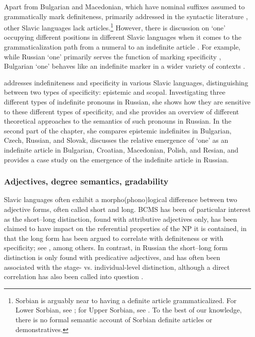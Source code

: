 \documentclass[output=paper,colorlinks,citecolor=brown]{langscibook}
\begin{document}
Apart from Bulgarian and Macedonian, which have nominal suffixes assumed to grammatically mark definiteness, primarily addressed in the syntactic literature \citep[for recent discussion, see][]{Rudin2021}, other Slavic languages lack articles.\footnote{Sorbian is arguably near to having a definite article grammaticalized. For Lower Sorbian, see \citet{Pankau2021}; for Upper Sorbian, see \citet{Scholze2012}. To the best of our knowledge, there is no formal semantic account of Sorbian definite articles or demonstratives.} However, there is discussion on `one' occupying different positions in different Slavic languages when it comes to the grammaticalization path from a numeral to an indefinite article \citep[see, e.g.,][]{Hwaszcz.Kedzierska2018,Seres2024,Molinari2025}. For example, while Russian `one' primarily serves the function of marking specificity \citep[see also][]{Ionin2013}, Bulgarian `one' behaves like an indefinite marker in a wider variety of contexts \citep[see, e.g.,][]{geist13,Gorishneva2013,gorishneva16}.

 addresses indefiniteness and specificity in various Slavic languages, distinguishing between two types of specificity: epistemic and scopal. Investigating three different types of indefinite pronouns in Russian, she shows how they are sensitive to these different types of specificity, and she provides an overview of different theoretical approaches to the semantics of such pronouns in Russian. In the second part of the chapter, she compares epistemic indefinites in Bulgarian, Czech, Russian, and Slovak, discusses the relative emergence of ‘one’ as an indefinite article in Bulgarian, Croatian, Macedonian, Polish, and Resian, and provides a case study on the emergence of the indefinite article in Russian.

\subsubsection{Adjectives, degree semantics, gradability}\label{gs:sec:adj} Slavic languages often exhibit a morpho(phono)logical difference between two adjective forms, often called short and long. BCMS has been of particular interest as the short--long distinction, found with attributive adjectives only, has been claimed to have impact on the referential properties of the NP it is contained, in that the long form has been argued to correlate with definiteness or with specificity; see \citet{aljovic02,trenkic04,stankovic15}, among others. In contrast, in Russian the short--long form distinction is only found with predicative adjectives, and has often been associated with the stage- vs. individual-level distinction, although a direct correlation has also been called into question \citep[see, e.g., discussion in][]{geist10adj}. 
\end{document}
